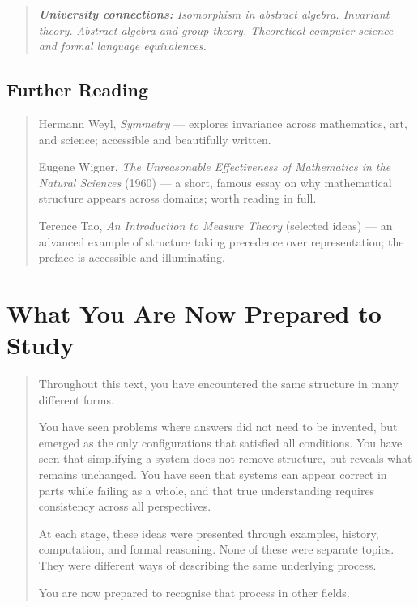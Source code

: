 \documentclass[11pt]{book}
\theoremstyle{plain}
\theoremstyle{definition}
\theoremstyle{remark}
\newenvironment{universitybridge}
  {\begin{quote}\small\itshape\textbf{University connections:}\normalfont\small\itshape\enspace\ignorespaces}
  {\end{quote}}
\newenvironment{readinglist}
  {\begin{quote}\small}
  {\end{quote}}
\begin{document}
\begin{universitybridge}
Isomorphism in abstract algebra. Invariant theory. Abstract algebra
and group theory. Theoretical computer science and formal language
equivalences.
\end{universitybridge}

\section*{Further Reading}

\begin{readinglist}
Hermann Weyl, \textit{Symmetry} --- explores invariance across
mathematics, art, and science; accessible and beautifully written.

Eugene Wigner, \textit{The Unreasonable Effectiveness of Mathematics
in the Natural Sciences} (1960) --- a short, famous essay on why
mathematical structure appears across domains; worth reading in full.

Terence Tao, \textit{An Introduction to Measure Theory} (selected
ideas) --- an advanced example of structure taking precedence over
representation; the preface is accessible and illuminating.
\end{readinglist}

\backmatter

\chapter*{What You Are Now Prepared to Study}

\begin{quote}
Throughout this text, you have encountered the same structure in many
different forms.

You have seen problems where answers did not need to be invented, but
emerged as the only configurations that satisfied all conditions. You
have seen that simplifying a system does not remove structure, but
reveals what remains unchanged. You have seen that systems can appear
correct in parts while failing as a whole, and that true understanding
requires consistency across all perspectives.

At each stage, these ideas were presented through examples, history,
computation, and formal reasoning. None of these were separate topics.
They were different ways of describing the same underlying process.

You are now prepared to recognise that process in other fields.
\end{quote}
\end{document}
